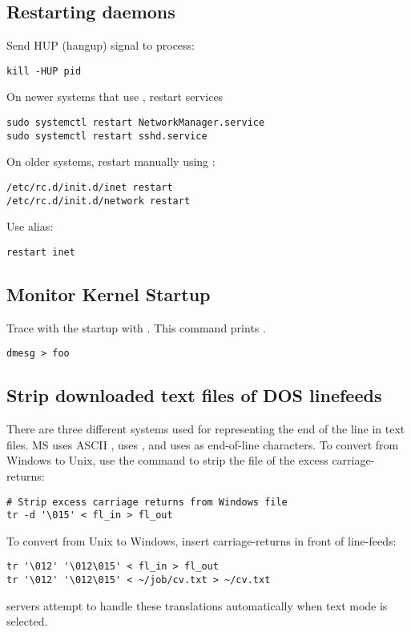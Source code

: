 \documentclass[12pt,twoside]{article}
\begin{document}
\subsection{Restarting daemons}\label{sxn:dmn2}
Send HUP (hangup) signal to process:
\begin{verbatim}
kill -HUP pid
\end{verbatim}

On newer systems that use , restart services
\begin{verbatim}
sudo systemctl restart NetworkManager.service
sudo systemctl restart sshd.service
\end{verbatim}

On older systems, restart  manually using :
\begin{verbatim}
/etc/rc.d/init.d/inet restart
/etc/rc.d/init.d/network restart
\end{verbatim}
Use alias:
\begin{verbatim}
restart inet
\end{verbatim}

\subsection{Monitor Kernel Startup}\label{sxn:krn2}
Trace with the  startup with .
This command prints .
\begin{verbatim}
dmesg > foo
\end{verbatim}

\subsection{Strip downloaded text files of DOS linefeeds}\label{sxn:dos}
There are three different systems used for representing the end of 
the line in text files. 
MS  uses ASCII ,  uses 
, and  uses  as end-of-line
characters.  
To convert from Windows to Unix, use the  command to strip
the file of the excess carriage-returns:
\begin{verbatim}
# Strip excess carriage returns from Windows file
tr -d '\015' < fl_in > fl_out
\end{verbatim}
To convert from Unix to Windows, insert carriage-returns in front of
line-feeds:
\begin{verbatim}
tr '\012' '\012\015' < fl_in > fl_out
tr '\012' '\012\015' < ~/job/cv.txt > ~/cv.txt
\end{verbatim}
 servers attempt to handle these translations
automatically when text mode is selected.
\end{document}
